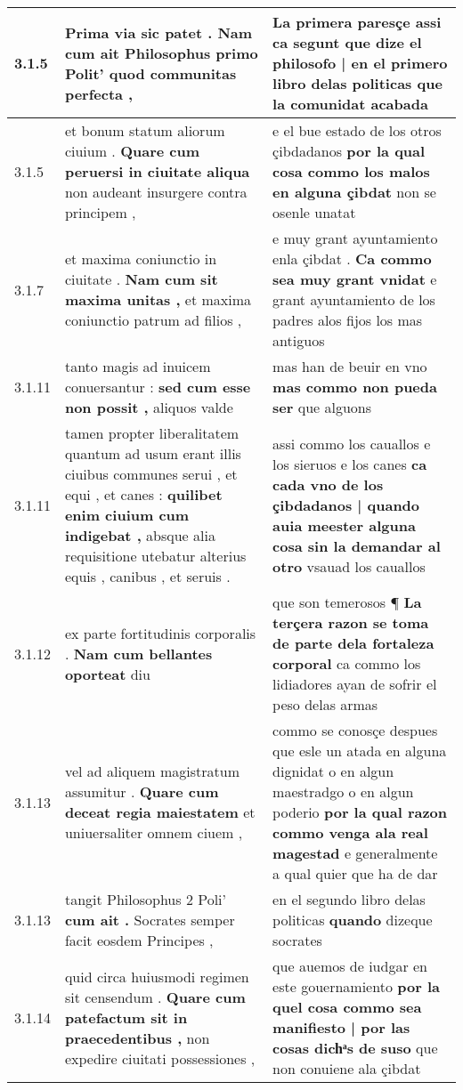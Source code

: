 \begin{tabular}{|p{1cm}|p{6.5cm}|p{6.5cm}|}
3.1.5 & Prima via sic patet . \textbf{ Nam cum ait Philosophus primo Polit’ } quod communitas perfecta , & La primera paresçe \textbf{ assi ca segunt que dize el philosofo | en el primero libro delas politicas } que la comunidat acabada \\\hline
3.1.5 & et bonum statum aliorum ciuium . \textbf{ Quare cum peruersi in ciuitate aliqua } non audeant insurgere contra principem , & e el bue estado de los otros çibdadanos \textbf{ por la qual cosa commo los malos en alguna çibdat } non se osenle unatat \\\hline
3.1.7 & et maxima coniunctio in ciuitate . \textbf{ Nam cum sit maxima unitas , } et maxima coniunctio patrum ad filios , & e muy grant ayuntamiento enla çibdat . \textbf{ Ca commo sea muy grant vnidat } e grant ayuntamiento de los padres alos fijos los mas antiguos \\\hline
3.1.11 & tanto magis ad inuicem conuersantur : \textbf{ sed cum esse non possit , } aliquos valde & mas han de beuir en vno \textbf{ mas commo non pueda ser } que alguons \\\hline
3.1.11 & tamen propter liberalitatem quantum ad usum erant illis ciuibus communes serui , et equi , et canes : \textbf{ quilibet enim ciuium cum indigebat , } absque alia requisitione utebatur alterius equis , canibus , et seruis . & assi commo los cauallos e los sieruos e los canes \textbf{ ca cada vno de los çibdadanos | quando auia meester alguna cosa sin la demandar al otro } vsauad los cauallos \\\hline
3.1.12 & ex parte fortitudinis corporalis . \textbf{ Nam cum bellantes oporteat } diu & que son temerosos ¶ \textbf{ La terçera razon se toma de parte dela fortaleza corporal } ca commo los lidiadores ayan de sofrir el peso delas armas \\\hline
3.1.13 & vel ad aliquem magistratum assumitur . \textbf{ Quare cum deceat regia maiestatem } et uniuersaliter omnem ciuem , & commo se conosçe despues que esle un atada en alguna dignidat o en algun maestradgo o en algun poderio \textbf{ por la qual razon commo venga ala real magestad } e generalmente a qual quier que ha de dar \\\hline
3.1.13 & tangit Philosophus 2 Poli’ \textbf{ cum ait . } Socrates semper facit eosdem Principes , & en el segundo libro delas politicas \textbf{ quando } dizeque socrates \\\hline
3.1.14 & quid circa huiusmodi regimen sit censendum . \textbf{ Quare cum patefactum sit in praecedentibus , } non expedire ciuitati possessiones , & que auemos de iudgar en este gouernamiento \textbf{ por la quel cosa commo sea manifiesto | por las cosas dichͣs de suso } que non conuiene ala çibdat \\\hline

\end{tabular}
